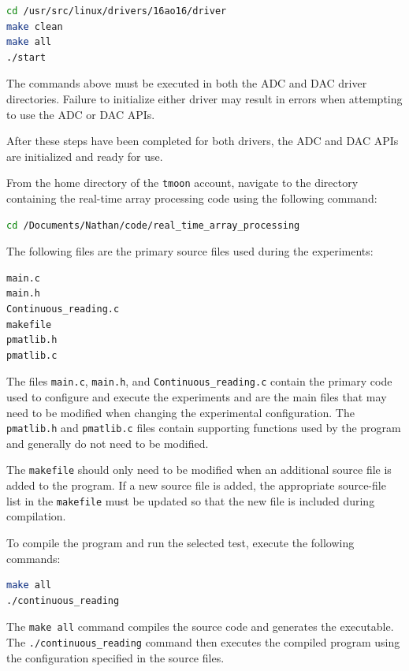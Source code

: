 \begin{lstlisting}[language=bash]
cd /usr/src/linux/drivers/16ao16/driver
make clean
make all
./start
\end{lstlisting}

The commands above must be executed in both the ADC and DAC driver directories. Failure to initialize either driver may result in errors when attempting to use the ADC or DAC APIs.

After these steps have been completed for both drivers, the ADC and DAC APIs are initialized and ready for use.

\label{sec:how_to_use_code}

From the home directory of the \texttt{tmoon} account, navigate to the directory containing the real-time array processing code using the following command:

\begin{lstlisting}[language=bash]
cd /Documents/Nathan/code/real_time_array_processing
\end{lstlisting}

The following files are the primary source files used during the experiments:

\begin{lstlisting}[language=bash]
main.c
main.h
Continuous_reading.c
makefile
pmatlib.h
pmatlib.c
\end{lstlisting}

The files \texttt{main.c}, \texttt{main.h}, and \texttt{Continuous\_reading.c} contain the primary code used to configure and execute the experiments and are the main files that may need to be modified when changing the experimental configuration. The \texttt{pmatlib.h} and \texttt{pmatlib.c} files contain supporting functions used by the program and generally do not need to be modified.

The \texttt{makefile} should only need to be modified when an additional source file is added to the program. If a new source file is added, the appropriate source-file list in the \texttt{makefile} must be updated so that the new file is included during compilation.

To compile the program and run the selected test, execute the following commands:

\begin{lstlisting}[language=bash]
make all
./continuous_reading
\end{lstlisting}

The \texttt{make all} command compiles the source code and generates the executable. The \texttt{./continuous\_reading} command then executes the compiled program using the configuration specified in the source files.

